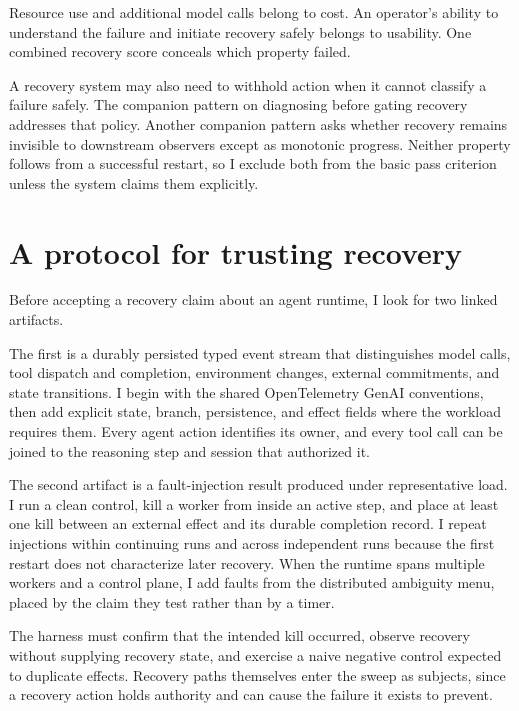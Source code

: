 Resource use and additional model calls belong to cost. An operator's ability to understand the failure and initiate recovery safely belongs to usability. One combined recovery score conceals which property failed.

A recovery system may also need to withhold action when it cannot classify a failure safely. The companion pattern on diagnosing before gating recovery addresses that policy. Another companion pattern asks whether recovery remains invisible to downstream observers except as monotonic progress. Neither property follows from a successful restart, so I exclude both from the basic pass criterion unless the system claims them explicitly.

\hypertarget{a-protocol-for-trusting-recovery}{%
\section{A protocol for trusting recovery}\label{a-protocol-for-trusting-recovery}}

Before accepting a recovery claim about an agent runtime, I look for two linked artifacts.

The first is a durably persisted typed event stream that distinguishes model calls, tool dispatch and completion, environment changes, external commitments, and state transitions. I begin with the shared OpenTelemetry GenAI conventions, then add explicit state, branch, persistence, and effect fields where the workload requires them. Every agent action identifies its owner, and every tool call can be joined to the reasoning step and session that authorized it.

The second artifact is a fault-injection result produced under representative load. I run a clean control, kill a worker from inside an active step, and place at least one kill between an external effect and its durable completion record. I repeat injections within continuing runs and across independent runs because the first restart does not characterize later recovery. When the runtime spans multiple workers and a control plane, I add faults from the distributed ambiguity menu, placed by the claim they test rather than by a timer.

The harness must confirm that the intended kill occurred, observe recovery without supplying recovery state, and exercise a naive negative control expected to duplicate effects. Recovery paths themselves enter the sweep as subjects, since a recovery action holds authority and can cause the failure it exists to prevent.

